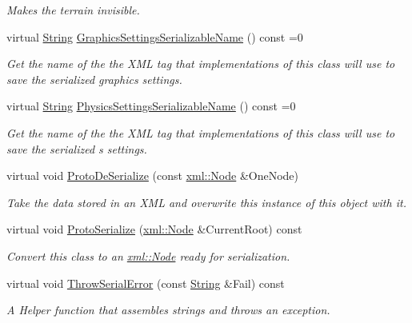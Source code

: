 \begin{DoxyCompactItemize}
\begin{DoxyCompactList}\small\item\em Makes the terrain invisible. \item\end{DoxyCompactList}\item 
virtual \hyperlink{namespaceMezzanine_acf9fcc130e6ebf08e3d8491aebcf1c86}{String} \hyperlink{classMezzanine_1_1WorldObject_adfdac35dc7396b6bc073e4e4c0af2f70}{GraphicsSettingsSerializableName} () const =0
\begin{DoxyCompactList}\small\item\em Get the name of the the XML tag that implementations of this class will use to save the serialized graphics settings. \item\end{DoxyCompactList}\item 
virtual \hyperlink{namespaceMezzanine_acf9fcc130e6ebf08e3d8491aebcf1c86}{String} \hyperlink{classMezzanine_1_1WorldObject_aefb4d8e679e03f55428404eb5cbe65d5}{PhysicsSettingsSerializableName} () const =0
\begin{DoxyCompactList}\small\item\em Get the name of the the XML tag that implementations of this class will use to save the serialized s settings. \item\end{DoxyCompactList}\item 
virtual void \hyperlink{classMezzanine_1_1WorldObject_a9175fe7ece14c44155ffa13e32ab3934}{ProtoDeSerialize} (const \hyperlink{classMezzanine_1_1xml_1_1Node}{xml::Node} \&OneNode)
\begin{DoxyCompactList}\small\item\em Take the data stored in an XML and overwrite this instance of this object with it. \item\end{DoxyCompactList}\item 
virtual void \hyperlink{classMezzanine_1_1WorldObject_a230cac0a630447d0466af326745c1e55}{ProtoSerialize} (\hyperlink{classMezzanine_1_1xml_1_1Node}{xml::Node} \&CurrentRoot) const 
\begin{DoxyCompactList}\small\item\em Convert this class to an \hyperlink{classMezzanine_1_1xml_1_1Node}{xml::Node} ready for serialization. \item\end{DoxyCompactList}\item 
virtual void \hyperlink{classMezzanine_1_1WorldObject_a4e7eeb271f355e1c35262f41bb1e63bc}{ThrowSerialError} (const \hyperlink{namespaceMezzanine_acf9fcc130e6ebf08e3d8491aebcf1c86}{String} \&Fail) const 
\begin{DoxyCompactList}\small\item\em A Helper function that assembles strings and throws an exception. \item\end{DoxyCompactList}\end{DoxyCompactItemize}
